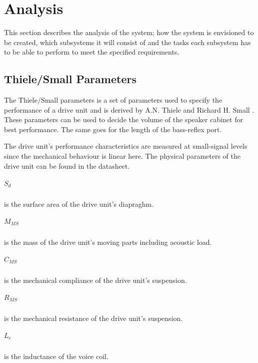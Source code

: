 
\chapter{Analysis}

This section describes the analysis of the system; how the system is envisioned to be created, which subsystems it will consist of and the tasks each subsystem has to be able to perform to meet the specified requirements.

\section{Thiele/Small Parameters}
The Thiele/Small parameters is a set of parameters used to specify the performance of a drive unit and is derived by A.N. Thiele \cite{thiele1971loudspeakers} and Richard H. Small \cite{small1972closed}.
These parameters can be used to decide the volume of the speaker cabinet for best performance. The same goes for the length of the bass-reflex port.

The drive unit's performance characteristics are measured at small-signal levels since the mechanical behaviour is linear here.  
The physical parameters of the drive unit can be found in the datasheet.

\paragraph{$S_d$} is the surface area of the drive unit's diapraghm.

\paragraph{$M_{MS}$} is the mass of the drive unit's moving parts including acoustic load.

\paragraph{$C_{MS}$} is the mechanical compliance of the drive unit's suspension.

\paragraph{$R_{MS}$} is the mechanical resistance of the drive unit's suspension.

\paragraph{$L_e$} is the inductance of the voice coil.


